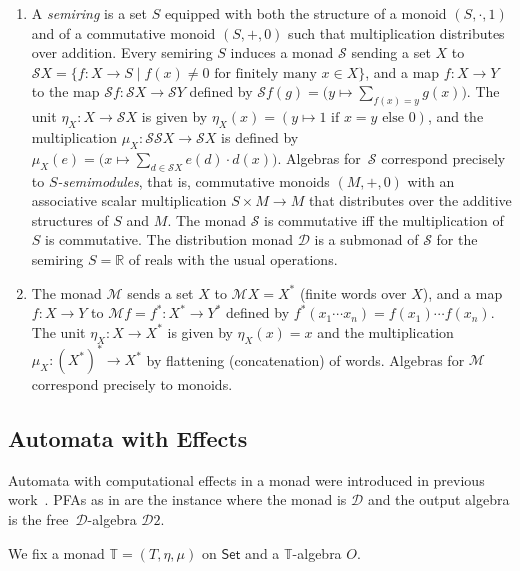 \documentclass[a4paper, UKenglish, numberwithinsect, thm-restate, cleveref, final]{lipics-v2021}
\theoremstyle{plain}
\theoremstyle{definition}
\renewcommand{\S}{\mathcal{S}}
\newcommand{\T}{\ensuremath{\mathbb{T}}\xspace}
\newcommand{\M}{\ensuremath{\mathcal{M}}\xspace}
\newcommand{\D}{\ensuremath{\mathcal{D}}}
\newcommand{\R}{\ensuremath{\mathds{R}}}
\newcommand{\Set}{\ensuremath{\mathsf{Set}}\xspace}
\newcommand{\mult}{\mathbin{\boldsymbol{\cdot}}}
\numberwithin{equation}{section}
\begin{document}
\begin{expl}
\begin{enumerate}[(1)]
\item\label{ex:monads:S} A \emph{semiring} is a set $S$ equipped with both the structure of a
  monoid $(S,\mult,1)$ and of a commutative monoid $(S,+,0)$ such that multiplication
  distributes over addition.  Every semiring $S$ induces a monad $\S$ sending a set $X$ to
  $\S X = \{ f\colon X\to S \mid f(x)\ne0 \text{ for finitely many $x\in X$} \}$, and a map
  $f\colon X\to Y$ to the map $\S f\colon \S X \to \S Y$ defined by
  $\S f(g) = \big(y\mapsto \sum_{f(x)=y} g(x)\big)$. The unit $\eta_X\colon X\to \S X$ is given
  by $\eta_{X}(x)=(y \mapsto 1 \text{ if } x=y \text{ else } 0)$, and the multiplication
  $\mu_X\colon \S\S X\to \S X$ is defined by
  $\mu_X(e)=\big(x \mapsto \sum_{d\in \S X} e(d) \cdot d(x)\big)$.  Algebras for~$\S$
  correspond precisely to \emph{$S$-semimodules}, that is, commutative monoids $(M,+,0)$ with an
  associative scalar multiplication $S\times M\to M$ that distributes over the additive
  structures of $S$ and $M$. The monad $\S$ is commutative iff the multiplication of $S$ is
  commutative. The distribution monad $\D$ is a submonad of $\S$ for the semiring $S=\R$ of
  reals with the usual operations.
\item\label{ex:monads:M} The monad $\M$ sends a set $X$ to $\M X=X^*$ (finite words over $X$),
  and a map $f\colon X\to Y$ to $\M f=f^*\colon X^*\to Y^*$ defined by $f^*(x_1\cdots
  x_n)=f(x_1)\cdots f(x_n)$. The unit $\eta_X\colon X\to X^*$ is given by $\eta_X(x)=x$ and
  the multiplication \mbox{$\mu_X\colon (X^*)^*\to X^*$} by flattening (concatenation) of
  words. Algebras for $\M$ correspond precisely to monoids.
\end{enumerate}
\end{expl}

\subsection{Automata with Effects}
Automata with computational effects in a monad were introduced in previous
work~\cite{sbbr13,gms14}. PFAs as in  are the instance where the monad is $\D$
and the output algebra is the free~$\D$-algebra $\D2$.

\begin{assumption}
  We fix a monad $\T=(T,\eta,\mu)$ on $\Set$ and a $\T$-algebra $O$.
\end{assumption}
\end{document}
